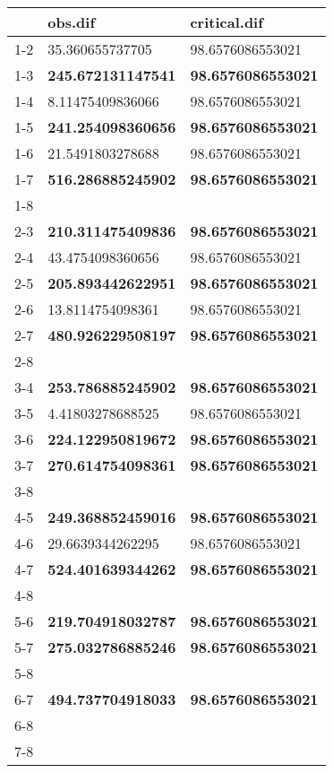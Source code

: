 \begin{table}[ht]
\centering
\begin{tabular}{rll}
  \hline
 & obs.dif & critical.dif \\ 
  \hline
1-2 & 35.360655737705 & 98.6576086553021 \\ 
  1-3 & \textbf{245.672131147541} & \textbf{98.6576086553021} \\ 
  1-4 & 8.11475409836066 & 98.6576086553021 \\ 
  1-5 & \textbf{241.254098360656} & \textbf{98.6576086553021} \\ 
  1-6 & 21.5491803278688 & 98.6576086553021 \\ 
  1-7 & \textbf{516.286885245902} & \textbf{98.6576086553021} \\ 
  1-8 &  &  \\ 
  2-3 & \textbf{210.311475409836} & \textbf{98.6576086553021} \\ 
  2-4 & 43.4754098360656 & 98.6576086553021 \\ 
  2-5 & \textbf{205.893442622951} & \textbf{98.6576086553021} \\ 
  2-6 & 13.8114754098361 & 98.6576086553021 \\ 
  2-7 & \textbf{480.926229508197} & \textbf{98.6576086553021} \\ 
  2-8 &  &  \\ 
  3-4 & \textbf{253.786885245902} & \textbf{98.6576086553021} \\ 
  3-5 & 4.41803278688525 & 98.6576086553021 \\ 
  3-6 & \textbf{224.122950819672} & \textbf{98.6576086553021} \\ 
  3-7 & \textbf{270.614754098361} & \textbf{98.6576086553021} \\ 
  3-8 &  &  \\ 
  4-5 & \textbf{249.368852459016} & \textbf{98.6576086553021} \\ 
  4-6 & 29.6639344262295 & 98.6576086553021 \\ 
  4-7 & \textbf{524.401639344262} & \textbf{98.6576086553021} \\ 
  4-8 &  &  \\ 
  5-6 & \textbf{219.704918032787} & \textbf{98.6576086553021} \\ 
  5-7 & \textbf{275.032786885246} & \textbf{98.6576086553021} \\ 
  5-8 &  &  \\ 
  6-7 & \textbf{494.737704918033} & \textbf{98.6576086553021} \\ 
  6-8 &  &  \\ 
  7-8 &  &  \\ 
   \hline
\end{tabular}
\end{table}
